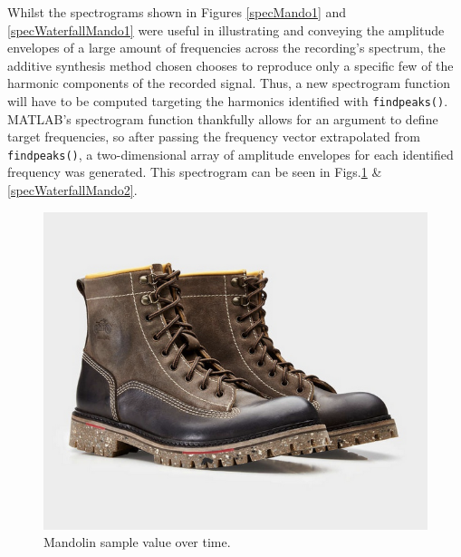 \documentclass{article}
\begin{document}
        Whilst the spectrograms shown in Figures \ref{specMando1} and \ref{specWaterfallMando1} were useful in illustrating and conveying the amplitude envelopes of a large amount of frequencies across the recording's spectrum, the additive synthesis method chosen chooses to reproduce only a specific few of the harmonic components of the recorded signal.
        Thus, a new spectrogram function will have to be computed targeting the harmonics identified with \texttt{findpeaks()}.
        MATLAB's spectrogram function thankfully allows for an argument to define target frequencies, so after passing the frequency vector extrapolated from \texttt{findpeaks()}, a two-dimensional array of amplitude envelopes for each identified frequency was generated.
        This spectrogram can be seen in Figs.\ref{specMando2} \& \ref{specWaterfallMando2}.
        \begin{figure}[h]
            \includegraphics[scale=0.25]{images/placeholder.png}%
            \centering
            \caption{Mandolin sample value over time.}
            \label{specMando2}
        \end{figure}
\end{document}
